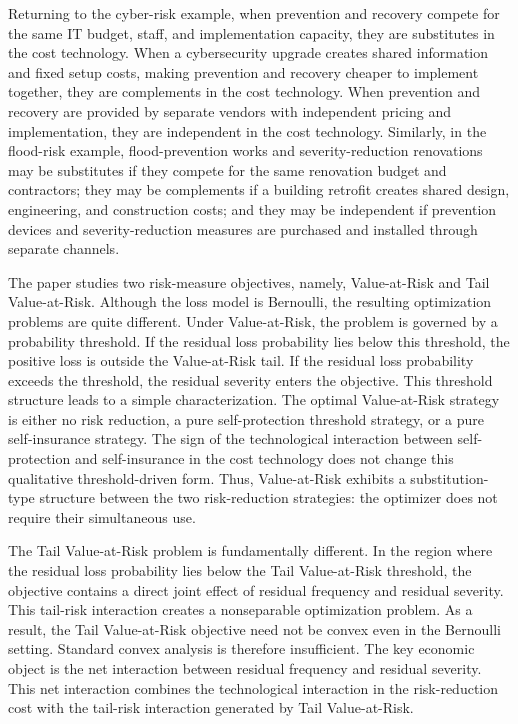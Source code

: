 \documentclass[a4paper,12pt]{article}
\begin{document}
Returning to the cyber-risk example, when prevention and recovery compete for the same IT budget, staff, and implementation capacity, they are substitutes in the cost technology. When a cybersecurity upgrade creates shared information and fixed setup costs, making prevention and recovery cheaper to implement together, they are complements in the cost technology. When prevention and recovery are provided by separate vendors with independent pricing and implementation, they are independent in the cost technology. Similarly, in the flood-risk example, flood-prevention works and severity-reduction renovations may be substitutes if they compete for the same renovation budget and contractors; they may be complements if a building retrofit creates shared design, engineering, and construction costs; and they may be independent if prevention devices and severity-reduction measures are purchased and installed through separate channels.

The paper studies two risk-measure objectives, namely, Value-at-Risk and Tail Value-at-Risk. Although the loss model is Bernoulli, the resulting optimization problems are quite different. Under Value-at-Risk, the problem is governed by a probability threshold. If the residual loss probability lies below this threshold, the positive loss is outside the Value-at-Risk tail. If the residual loss probability exceeds the threshold, the residual severity enters the objective. This threshold structure leads to a simple characterization. The optimal Value-at-Risk strategy is either no risk reduction, a pure self-protection threshold strategy, or a pure self-insurance strategy. The sign of the technological interaction between self-protection and self-insurance in the cost technology does not change this qualitative threshold-driven form. Thus, Value-at-Risk exhibits a substitution-type structure between the two risk-reduction strategies: the optimizer does not require their simultaneous use.

The Tail Value-at-Risk problem is fundamentally different. In the region where the residual loss probability lies below the Tail Value-at-Risk threshold, the objective contains a direct joint effect of residual frequency and residual severity. This tail-risk interaction creates a nonseparable optimization problem. As a result, the Tail Value-at-Risk objective need not be convex even in the Bernoulli setting. Standard convex analysis is therefore insufficient. The key economic object is the net interaction between residual frequency and residual severity. This net interaction combines the technological interaction in the risk-reduction cost with the tail-risk interaction generated by Tail Value-at-Risk.
\end{document}
